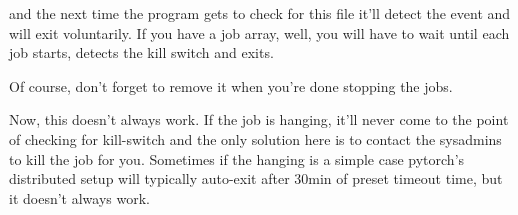 \documentclass[
]{report}
\newenvironment{Shaded}{\begin{snugshade}}{\end{snugshade}}
\newcommand{\FunctionTok}[1]{\textcolor[rgb]{0.28,0.35,0.67}{#1}}
\newcommand{\NormalTok}[1]{\textcolor[rgb]{0.00,0.23,0.31}{#1}}
\newcommand{\VariableTok}[1]{\textcolor[rgb]{0.07,0.07,0.07}{#1}}
\begin{document}
and the next time the program gets to check for this file it'll detect
the event and will exit voluntarily. If you have a job array, well, you
will have to wait until each job starts, detects the kill switch and
exits.

Of course, don't forget to remove it when you're done stopping the jobs.

\begin{Shaded}
\end{Shaded}

Now, this doesn't always work. If the job is hanging, it'll never come
to the point of checking for kill-switch and the only solution here is
to contact the sysadmins to kill the job for you. Sometimes if the
hanging is a simple case pytorch's distributed setup will typically
auto-exit after 30min of preset timeout time, but it doesn't always
work.
\end{document}
